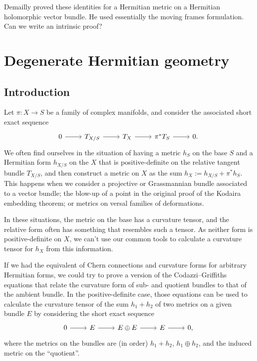 \documentclass[10pt,a4paper]{article}
\begin{document}
Demailly proved these identities for a Hermitian metric on a Hermitian holomorphic vector bundle. He used essentially the moving frames formulation. Can we write an intrinsic proof?



\section{Degenerate Hermitian geometry}
\label{sec:deglinalg}



\subsection*{Introduction}

Let $\pi : X \to S$ be a family of complex manifolds, and consider the associated short exact sequence
\[
\begin{tikzcd}
0 \ar[r] & T_{X/S} \ar[r] & T_X \ar[r] & \pi^*T_S \ar[r] & 0.
\end{tikzcd}
\]
We often find ourselves in the situation of having a metric $h_S$ on the base $S$ and a Hermitian form $h_{X/S}$ on the $X$ that is positive-definite on the relative tangent bundle $T_{X/S}$, and then construct a metric on $X$ as the sum $h_X := h_{X/S} + \pi^*h_S$. This happens when we consider a projective or Grassmannian bundle associated to a vector bundle; the blow-up of a point in the original proof of the Kodaira embedding theorem; or metrics on versal families of deformations.

In these situations, the metric on the base has a curvature tensor, and the relative form often has something that resembles such a tensor. As neither form is positive-definite on $X$, we can't use our common tools to calculate a curvature tensor for $h_X$ from this information.

If we had the equivalent of Chern connections and curvature forms for arbitrary Hermitian forms, we could try to prove a version of the Codazzi--Griffiths equations that relate the curvature form of sub- and quotient bundles to that of the ambient bundle. In the positive-definite case, those equations can be used to calculate the curvature tensor of the sum $h_1 + h_2$ of two metrics on a given bundle $E$ by considering the short exact sequence
\[
\begin{tikzcd}
0 \ar[r] & E \ar[r] & E\oplus E \ar[r] &  E \ar[r] & 0,
\end{tikzcd}
\]
where the metrics on the bundles are (in order) $h_1 + h_2$, $h_1 \oplus h_2$, and the induced metric on the ``quotient''.
\end{document}
